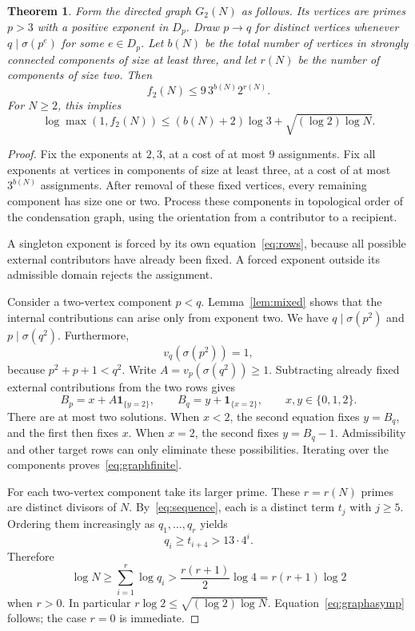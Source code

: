 \documentclass[11pt]{article}
\newtheorem{theorem}{Theorem}[section]
\begin{document}
\begin{theorem}\label{thm:graph}
Form the directed graph $G_2(N)$ as follows. Its vertices are primes $p>3$ with a positive exponent in $D_p$. Draw $p\to q$ for distinct vertices whenever $q\mid\sigma(p^e)$ for some $e\in D_p$. Let $b(N)$ be the total number of vertices in strongly connected components of size at least three, and let $r(N)$ be the number of components of size two. Then
\begin{equation}\label{eq:graphfinite}
 \boxed{f_2(N)\le9\,3^{b(N)}2^{r(N)}.}
\end{equation}
For $N\ge2$, this implies
\begin{equation}\label{eq:graphasymp}
 \boxed{\log\max(1,f_2(N))\le (b(N)+2)\log3+\sqrt{(\log2)\log N}.}
\end{equation}
\end{theorem}
\begin{proof}
Fix the exponents at $2,3$, at a cost of at most $9$ assignments. Fix all exponents at vertices in components of size at least three, at a cost of at most $3^{b(N)}$ assignments. After removal of these fixed vertices, every remaining component has size one or two. Process these components in topological order of the condensation graph, using the orientation from a contributor to a recipient.

A singleton exponent is forced by its own equation~\eqref{eq:rows}, because all possible external contributors have already been fixed. A forced exponent outside its admissible domain rejects the assignment.

Consider a two-vertex component $p<q$. Lemma~\ref{lem:mixed} shows that the internal contributions can arise only from exponent two. We have $q\mid\sigma(p^2)$ and $p\mid\sigma(q^2)$. Furthermore,
\[
 v_q(\sigma(p^2))=1,
\]
because $p^2+p+1<q^2$. Write $A=v_p(\sigma(q^2))\ge1$. Subtracting already fixed external contributions from the two rows gives
\begin{equation}\label{eq:twovars}
 B_p=x+A\mathbf1_{\{y=2\}},\qquad
 B_q=y+\mathbf1_{\{x=2\}},\qquad x,y\in\{0,1,2\}.
\end{equation}
There are at most two solutions. When $x<2$, the second equation fixes $y=B_q$, and the first then fixes $x$. When $x=2$, the second fixes $y=B_q-1$. Admissibility and other target rows can only eliminate these possibilities. Iterating over the components proves~\eqref{eq:graphfinite}.

For each two-vertex component take its larger prime. These $r=r(N)$ primes are distinct divisors of $N$. By~\eqref{eq:sequence}, each is a distinct term $t_j$ with $j\ge5$. Ordering them increasingly as $q_1,\ldots,q_r$ yields
\[
 q_i\ge t_{i+4}>13\cdot4^i.
\]
Therefore
\[
 \log N\ge\sum_{i=1}^r\log q_i>
  \frac{r(r+1)}2\log4=r(r+1)\log2
\]
when $r>0$. In particular $r\log2\le\sqrt{(\log2)\log N}$. Equation~\eqref{eq:graphasymp} follows; the case $r=0$ is immediate.
\end{proof}
\end{document}
